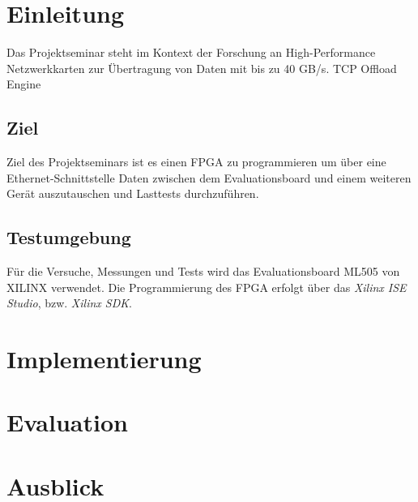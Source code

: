 \chapter{Einleitung}

Das Projektseminar steht im Kontext der Forschung an High-Performance Netzwerkkarten zur Übertragung von Daten mit bis zu 40 GB/s. TCP Offload Engine

\section{Ziel}

Ziel des Projektseminars ist es einen \ac{FPGA} zu programmieren um über eine Ethernet-Schnittstelle Daten zwischen dem Evaluationsboard und einem weiteren Gerät auszutauschen und Lasttests durchzuführen.

\section{Testumgebung}

Für die Versuche, Messungen und Tests wird das Evaluationsboard ML505 von XILINX verwendet. Die Programmierung des \ac{FPGA} erfolgt über das \textit{Xilinx ISE Studio}, bzw. \textit{Xilinx SDK}.



\chapter{Implementierung}

\chapter{Evaluation}

\chapter{Ausblick}